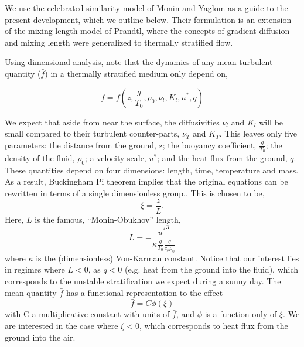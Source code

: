We use the celebrated similarity model of Monin and
Yaglom\cite{monin2007statistical,monin1954basic} as a guide to the
present development, which we outline below. Their formulation is an
extension of the mixing-length model of Prandtl, where the concepts of
gradient diffusion and mixing length were generalized to thermally
stratified flow.   

%
%

Using dimensional analysis, note that the dynamics of
any mean turbulent quantity ($\bar f$) in a thermally stratified medium 
only depend on,  

\begin{equation}
\bar f = f(z,\frac{g}{T_0},\rho_0,\nu_l,K_l,u^*,q)
\end{equation}

We expect that aside from near the surface, the diffusivities $\nu_l$
and $K_l$ will be small compared to their turbulent counter-parts, $\nu_T$
and $K_T$. 
This leaves only five parameters: the distance from the ground, z; the
buoyancy coefficient, $\frac{g}{T_0}$; the density of the fluid,
$\rho_0$; a velocity scale, $u^*$; and the heat flux from the ground,
$q$. 
%
% 
These quantities depend on
four dimensions: length, time, temperature and mass. As a result, 
Buckingham Pi theorem implies that 
the original equations can be rewritten in terms of a 
single dimensionless group.\cite{munson2012fundamentals}. This is
chosen to be,
\begin{equation}
 \xi = \frac{z}{L}.
\end{equation}
Here, $L$ is the famous, ``Monin-Obukhov'' length,
\begin{equation}
 L = -\frac{{u^*}^3}{\kappa \frac{g}{T_0} \frac{q}{c_p \rho_0}}
\end{equation}
where $\kappa$ is the (dimensionless) Von-Karman constant. Notice that
our interest lies in regimes where $L<0$, as $q<0$ (e.g. heat from the
ground into the fluid), which corresponds to the unstable stratification 
we expect during a sunny day. The mean quantity $\bar f$ has a
functional representation to the effect
\begin{equation}
 \bar f = C \phi(\xi)
\end{equation}
with C a multiplicative constant with units of $\bar f$, and $\phi$ is a
function only of $\xi$. We are interested in the case where $\xi<0$, which
corresponds to heat flux from the ground into the air.

